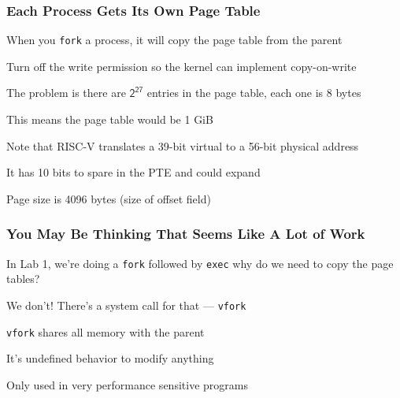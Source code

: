   \begin{frame}
    \frametitle{Each Process Gets Its Own Page Table}

    When you \texttt{fork} a process, it will copy the page table from the parent

    \hspace{2em} Turn off the write permission so the kernel can implement
    copy-on-write

    \vspace{2em}

    The problem is there are $\mathsf{2^{27}}$ entries in the page table, each
    one is 8 bytes

    \hspace{2em} This means the page table would be 1 GiB

    \vspace{2em}

    Note that RISC-V translates a 39-bit virtual to a 56-bit physical address

    \hspace{2em} It has 10 bits to spare in the PTE and could expand

    \hspace{2em} Page size is 4096 bytes (size of offset field)
  \end{frame}

  \begin{frame}
    \frametitle{You May Be Thinking That Seems Like A Lot of Work}

    In Lab 1, we're doing a \texttt{fork} followed by \texttt{exec} why do we
    need to copy the page tables?

    \vspace{2em}

    We don't! There's a system call for that --- \texttt{vfork}

    \vspace{2em}

    \texttt{vfork} shares all memory with the parent

    \hspace{2em} It's undefined behavior to modify anything

    \vspace{2em}

    Only used in very performance sensitive programs
  \end{frame}

